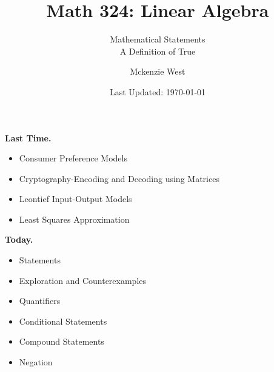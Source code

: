 \documentclass[handout]{beamer}
\theoremstyle{definition}
\begin{document}
	\title{Math 324: Linear Algebra}
	\subtitle{Mathematical Statements\\A Definition of True}
	\author{Mckenzie West}
	\date{Last Updated: \today}
\begin{frame}
\maketitle
\end{frame}

\begin{frame}{\insertframenumber}
	\begin{block}{\textbf{Last Time.}}
	\begin{itemize}[label=--]
		\item Consumer Preference Models
		\item Cryptography-Encoding and Decoding using Matrices
		\item Leontief Input-Output Models
		\item Least Squares Approximation
	\end{itemize}
	\end{block}
\begin{block}{\textbf{Today.}}
	\begin{itemize}[label=--]
		\item Statements
		\item Exploration and Counterexamples
		\item Quantifiers
		\item Conditional Statements
		\item Compound Statements
		\item Negation
	\end{itemize}
\end{block}
\end{frame}
\end{document}
